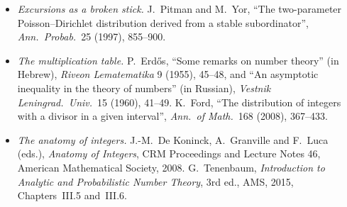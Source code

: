 \begin{itemize}
\item \emph{Excursions as a broken stick.} J.~Pitman and M.~Yor, ``The two-parameter Poisson--Dirichlet distribution derived from a stable subordinator'', \emph{Ann.\ Probab.}\ 25 (1997), 855--900.
\item \emph{The multiplication table.} P.~Erd\H{o}s, ``Some remarks on number theory'' (in Hebrew), \emph{Riveon Lematematika} 9 (1955), 45--48, and ``An asymptotic inequality in the theory of numbers'' (in Russian), \emph{Vestnik Leningrad.\ Univ.}\ 15 (1960), 41--49. K.~Ford, ``The distribution of integers with a divisor in a given interval'', \emph{Ann.\ of Math.}\ 168 (2008), 367--433.
\item \emph{The anatomy of integers.} J.-M.~De Koninck, A.~Granville and F.~Luca (eds.), \emph{Anatomy of Integers}, CRM Proceedings and Lecture Notes 46, American Mathematical Society, 2008. G.~Tenenbaum, \emph{Introduction to Analytic and Probabilistic Number Theory}, 3rd ed., AMS, 2015, Chapters~III.5 and~III.6.
\end{itemize}
